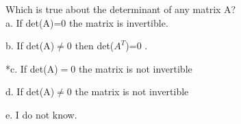 
Which is true about the determinant of any matrix A?\\

a. If det(A)=0 the matrix is invertible.

b. If det(A)\(\neq 0\) then det(\(A^{T}\))=0 .

*c. If det(A)\(= 0\) the matrix is not invertible

d. If det(A)\(\neq 0\) the matrix is not invertible

e. I do not know.\\
